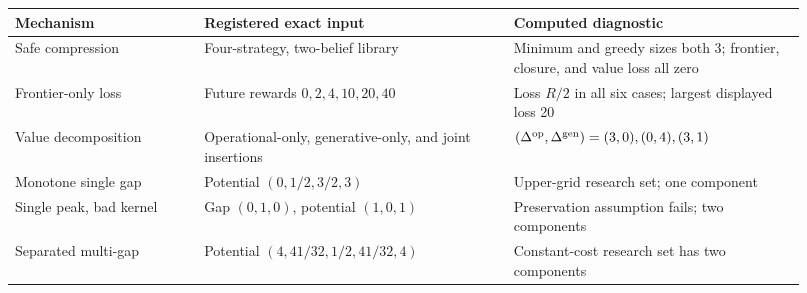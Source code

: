 \begin{tabular}{@{}p{0.22\linewidth}p{0.36\linewidth}p{0.34\linewidth}@{}}
\toprule
Mechanism & Registered exact input & Computed diagnostic \\
\midrule
Safe compression & Four-strategy, two-belief library & Minimum and greedy sizes both 3; frontier, closure, and value loss all zero \\
Frontier-only loss & Future rewards \(0,2,4,10,20,40\) & Loss \(R/2\) in all six cases; largest displayed loss 20 \\
Value decomposition & Operational-only, generative-only, and joint insertions & \((\Delta^{\mathrm{op}},\Delta^{\mathrm{gen}})=(3,0),(0,4),(3,1)\) \\
Monotone single gap & Potential \((0,1/2,3/2,3)\) & Upper-grid research set; one component \\
Single peak, bad kernel & Gap \((0,1,0)\), potential \((1,0,1)\) & Preservation assumption fails; two components \\
Separated multi-gap & Potential \((4,41/32,1/2,41/32,4)\) & Constant-cost research set has two components \\
\bottomrule
\end{tabular}
